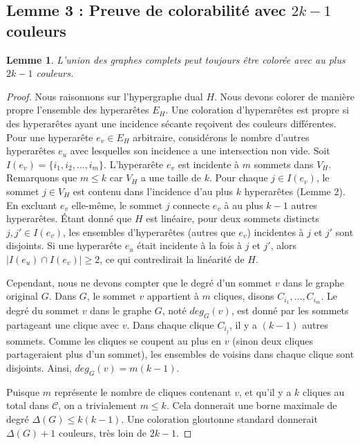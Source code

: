 \documentclass[12pt,a4paper]{article}
\newtheorem{lemma}{Lemme}
\begin{document}
\subsection{Lemme 3 : Preuve de colorabilité avec $2k-1$ couleurs}
\begin{lemma}
L'union des graphes complets peut toujours être colorée avec au plus $2k-1$ couleurs.
\end{lemma}
\begin{proof}
Nous raisonnons sur l'hypergraphe dual $H$. Nous devons colorer de manière propre l'ensemble des hyperarêtes $E_H$.
Une coloration d'hyperarêtes est propre si des hyperarêtes ayant une incidence sécante reçoivent des couleurs différentes.
Pour une hyperarête $e_v \in E_H$ arbitraire, considérons le nombre d'autres hyperarêtes $e_u$ avec lesquelles son incidence a une intersection non vide.
Soit $I(e_v) = \{i_1, i_2, \dots, i_m\}$. L'hyperarête $e_v$ est incidente à $m$ sommets dans $V_H$. Remarquons que $m \le k$ car $V_H$ a une taille de $k$.
Pour chaque $j \in I(e_v)$, le sommet $j \in V_H$ est contenu dans l'incidence d'au plus $k$ hyperarêtes (Lemme 2).
En excluant $e_v$ elle-même, le sommet $j$ connecte $e_v$ à au plus $k-1$ autres hyperarêtes.
Étant donné que $H$ est linéaire, pour deux sommets distincts $j, j' \in I(e_v)$, les ensembles d'hyperarêtes (autres que $e_v$) incidentes à $j$ et $j'$ sont disjoints. Si une hyperarête $e_u$ était incidente à la fois à $j$ et $j'$, alors $|I(e_u) \cap I(e_v)| \ge 2$, ce qui contredirait la linéarité de $H$.

Cependant, nous ne devons compter que le degré d'un sommet $v$ dans le graphe original $G$. Dans $G$, le sommet $v$ appartient à $m$ cliques, disons $C_{i_1}, \dots, C_{i_m}$.
Le degré du sommet $v$ dans le graphe $G$, noté $deg_G(v)$, est donné par les sommets partageant une clique avec $v$.
Dans chaque clique $C_{i_j}$, il y a $(k-1)$ autres sommets.
Comme les cliques se coupent au plus en $v$ (sinon deux cliques partageraient plus d'un sommet), les ensembles de voisins dans chaque clique sont disjoints.
Ainsi, $deg_G(v) = m(k-1)$.

Puisque $m$ représente le nombre de cliques contenant $v$, et qu'il y a $k$ cliques au total dans $\mathcal{C}$, on a trivialement $m \le k$.
Cela donnerait une borne maximale de degré $\Delta(G) \le k(k-1)$. Une coloration gloutonne standard donnerait $\Delta(G)+1$ couleurs, très loin de $2k-1$.


\end{proof}
\end{document}
